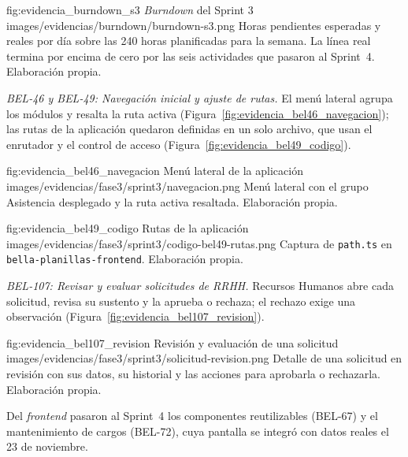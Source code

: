 \figuraEvidencia
    {fig:evidencia_burndown_s3}
    {\textit{Burndown} del Sprint 3}
    {images/evidencias/burndown/burndown-s3.png}
    {Horas pendientes esperadas y reales por día sobre las 240 horas planificadas para la semana.
    La línea real termina por encima de cero por las seis actividades que pasaron al Sprint~4. Elaboración propia.}

\par\smallskip
\noindent\textit{BEL-46 y BEL-49: Navegación inicial y ajuste de rutas.}
El menú lateral agrupa los módulos y resalta la ruta activa (Figura~\ref{fig:evidencia_bel46_navegacion});
las rutas de la aplicación quedaron definidas en un solo archivo, que usan el enrutador y el control de acceso (Figura~\ref{fig:evidencia_bel49_codigo}).

\figuraEvidenciaCompacta
    {fig:evidencia_bel46_navegacion}
    {Menú lateral de la aplicación}
    {images/evidencias/fase3/sprint3/navegacion.png}
    {Menú lateral con el grupo Asistencia desplegado y la ruta activa resaltada. Elaboración propia.}

\figuraEvidenciaCompacta
    {fig:evidencia_bel49_codigo}
    {Rutas de la aplicación}
    {images/evidencias/fase3/sprint3/codigo-bel49-rutas.png}
    {Captura de \texttt{path.ts} en \texttt{bella-planillas-frontend}. Elaboración propia.}

\par\smallskip
\noindent\textit{BEL-107: Revisar y evaluar solicitudes de RRHH.}
Recursos Humanos abre cada solicitud, revisa su sustento y la aprueba o rechaza;
el rechazo exige una observación (Figura~\ref{fig:evidencia_bel107_revision}).

\figuraEvidenciaCompacta
    {fig:evidencia_bel107_revision}
    {Revisión y evaluación de una solicitud}
    {images/evidencias/fase3/sprint3/solicitud-revision.png}
    {Detalle de una solicitud en revisión con sus datos, su historial y las acciones para aprobarla o rechazarla. Elaboración propia.}

\par\smallskip
Del \textit{frontend} pasaron al Sprint~4 los componentes reutilizables (BEL-67) y el mantenimiento de cargos (BEL-72), 
cuya pantalla se integró con datos reales el 23 de noviembre.



